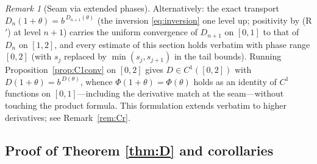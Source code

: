 \documentclass[11pt]{article}
\theoremstyle{definition}
\theoremstyle{remark}
\newtheorem{remark}[theorem]{Remark}
\begin{document}
\begin{remark}[Seam via extended phases]\label{rem:ext}
Alternatively: the exact transport
$D_n(1+\theta)=b^{\,D_{n+1}(\theta)}$ (the inversion \eqref{eq:inversion}
one level up; positivity by \textup{(R$'$)} at level $n{+}1$) carries the
uniform convergence of $D_{n+1}$ on $[0,1]$ to that of $D_n$ on $[1,2]$,
and every estimate of this section holds verbatim with phase range
$[0,2]$ (with $s_j$ replaced by $\min(s_j,s_{j+1})$ in the tail bounds).
Running Proposition~\ref{prop:C1conv} on $[0,2]$ gives
$D\in C^{1}([0,2])$ with $D(1+\theta)=b^{\,D(\theta)}$, whence
$\Phi(1+\theta)=\Phi(\theta)$ holds as an identity of $C^{1}$ functions on
$[0,1]$---including the derivative match at the seam---without touching
the product formula. This formulation extends verbatim to higher
derivatives; see Remark~\ref{rem:Cr}.
\end{remark}

\subsection{Proof of Theorem \ref{thm:D} and corollaries}
\end{document}
